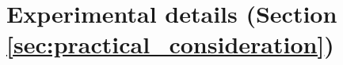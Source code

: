 
\section{Experimental details (Section \ref{sec:practical_consideration})}
\label{sec:practical_consideration_experiment_details}










\begin{comment}
 Recently, ~\citet{OsbandEtAl23} showed that for a UQ methodology to be useful for decision making, it should capture the epistemic uncertainty well. Epistemic uncertainty is the uncertainty that  can  be resolved  with more data as opposed to the aleatoric uncertainty which is due to idiosyncratic noise in the outcome measurement process~\citep{,}. 
 
 In this regard, 
the most common metric used for assessing the uncertainty quantification is the marginal likelihood. Traditionally, marginal likelihood of for predicting one test example, \E[logˆP(Y|X)]\E[\log \hat{P}(Y|X)], was used as an metric to assess the model performance~\citep{,}. 

However, ~\citet{OsbandEtAl23} showed that considering this metric  fails to asses the UQ methodology's ability to capture the epistemic uncertainty. Further \citet{OsbandEtAl23} showed that marginal likelihood for predicting a  batch of test examples, $\E[\log P(Y_{1:\tau}|X_{1:\tau})]\E[\log \hat{P}(Y_{1:\tau}|X_{1:\tau})]$, is a better metric to assess UQ methodology's ability to capture the epistemic uncertainty. 

~\citet{} referred to former as \textit{marginal log-loss} and latter as \textit{joint log-loss} respectively. 

For high dimensional data, $\tau$ needed to capture this phenomenon might be very large and computationally expensive.~\citet{} introduced joint log-loss with dyadic sampling to overcome this computational challenge.~\citet{} introduced posterior predictive correlations (PPCs) as a metric to assess the UQ methodologies in the regression setting,  which in spirit tries to capture a notion similar to joint log loss.  We use both the marginal likelihood for predicting one test example (\textit{marginal log-loss}) and a batch of test example (\textit{joint log-loss}) in our benchmark. 
\end{comment}

